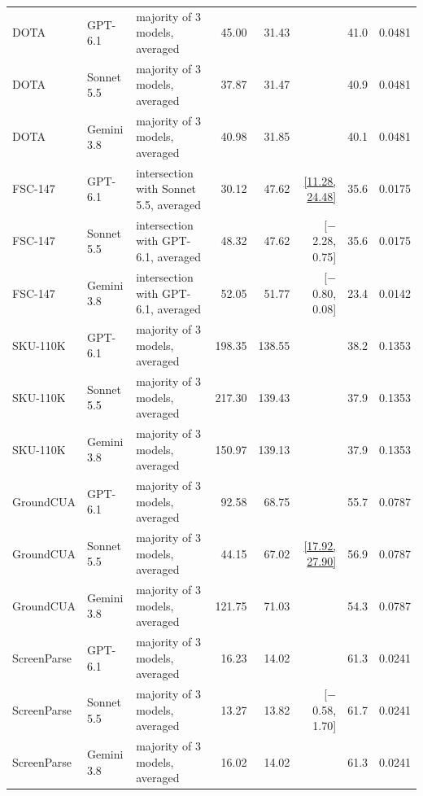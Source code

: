 {\begin{longtable}{@{}ll>{\raggedright\arraybackslash}p{4.2cm}rrrrr@{}}
\quad DOTA & GPT-6.1 & majority of 3 models, averaged & 45.00 & 31.43 & {\bfseries\boldmath [$-$21.90, $-$7.27]} & 41.0 & 0.0481 \\
\quad DOTA & Sonnet 5.5 & majority of 3 models, averaged & 37.87 & 31.47 & {\bfseries\boldmath [$-$10.40, $-$3.15]} & 40.9 & 0.0481 \\
\quad DOTA & Gemini 3.8 & majority of 3 models, averaged & 40.98 & 31.85 & {\bfseries\boldmath [$-$13.83, $-$5.02]} & 40.1 & 0.0481 \\
\quad FSC-147 & GPT-6.1 & intersection with Sonnet 5.5, averaged & 30.12 & 47.62 & \underline{[11.28, 24.48]} & 35.6 & 0.0175 \\
\quad FSC-147 & Sonnet 5.5 & intersection with GPT-6.1, averaged & 48.32 & 47.62 & [$-$2.28, 0.75] & 35.6 & 0.0175 \\
\quad FSC-147 & Gemini 3.8 & intersection with GPT-6.1, averaged & 52.05 & 51.77 & [$-$0.80, 0.08] & 23.4 & 0.0142 \\
\quad SKU-110K & GPT-6.1 & majority of 3 models, averaged & 198.35 & 138.55 & {\bfseries\boldmath [$-$72.30, $-$47.70]} & 38.2 & 0.1353 \\
\quad SKU-110K & Sonnet 5.5 & majority of 3 models, averaged & 217.30 & 139.43 & {\bfseries\boldmath [$-$92.02, $-$64.67]} & 37.9 & 0.1353 \\
\quad SKU-110K & Gemini 3.8 & majority of 3 models, averaged & 150.97 & 139.13 & {\bfseries\boldmath [$-$17.20, $-$6.78]} & 37.9 & 0.1353 \\
\quad GroundCUA & GPT-6.1 & majority of 3 models, averaged & 92.58 & 68.75 & {\bfseries\boldmath [$-$29.70, $-$18.27]} & 55.7 & 0.0787 \\
\quad GroundCUA & Sonnet 5.5 & majority of 3 models, averaged & 44.15 & 67.02 & \underline{[17.92, 27.90]} & 56.9 & 0.0787 \\
\quad GroundCUA & Gemini 3.8 & majority of 3 models, averaged & 121.75 & 71.03 & {\bfseries\boldmath [$-$59.05, $-$42.70]} & 54.3 & 0.0787 \\
\quad ScreenParse & GPT-6.1 & majority of 3 models, averaged & 16.23 & 14.02 & {\bfseries\boldmath [$-$3.18, $-$1.28]} & 61.3 & 0.0241 \\
\quad ScreenParse & Sonnet 5.5 & majority of 3 models, averaged & 13.27 & 13.82 & [$-$0.58, 1.70] & 61.7 & 0.0241 \\
\quad ScreenParse & Gemini 3.8 & majority of 3 models, averaged & 16.02 & 14.02 & {\bfseries\boldmath [$-$2.85, $-$1.28]} & 61.3 & 0.0241 \\
\midrule

\end{longtable}}
